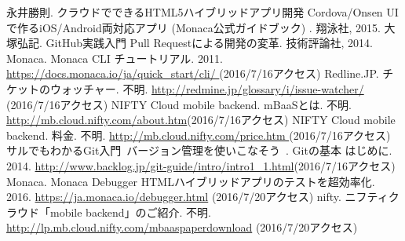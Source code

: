 \documentclass[openany,11pt,papersize]{jsbook}
\begin{document}
%
\maketitle

\frontmatter



\tableofcontents%


\mainmatter%



%









%





\begin{appendix}





\end{appendix}



\begin{thebibliography}{9}
 永井勝則. クラウドでできるHTML5ハイブリッドアプリ開発 Cordova/Onsen UIで作るiOS/Android両対応アプリ (Monaca公式ガイドブック) . 翔泳社, 2015.
 大塚弘記. GitHub実践入門 Pull Requestによる開発の変革. 技術評論社, 2014.
 Monaca. Monaca CLI チュートリアル. 2011. \url{https://docs.monaca.io/ja/quick_start/cli/ }(2016/7/16アクセス)
 Redline.JP. チケットのウォッチャー. 不明. \url{http://redmine.jp/glossary/i/issue-watcher/ }(2016/7/16アクセス)
 NIFTY Cloud mobile backend. mBaaSとは. 不明. \url{http://mb.cloud.nifty.com/about.htm}(2016/7/16アクセス)
 NIFTY Cloud mobile backend. 料金. 不明. \url{http://mb.cloud.nifty.com/price.htm }(2016/7/16アクセス)
 サルでもわかるGit入門~バージョン管理を使いこなそう~. Gitの基本 はじめに. 2014. \url{http://www.backlog.jp/git-guide/intro/intro1_1.html}(2016/7/16アクセス)
 Monaca. Monaca Debugger HTMLハイブリッドアプリのテストを超効率化. 2016. \url{https://ja.monaca.io/debugger.html} (2016/7/20アクセス)
 nifty. ニフティクラウド「mobile backend」のご紹介. 不明. \url{http://lp.mb.cloud.nifty.com/mbaaspaperdownload} (2016/7/20アクセス)
\end{thebibliography}
\end{document}
